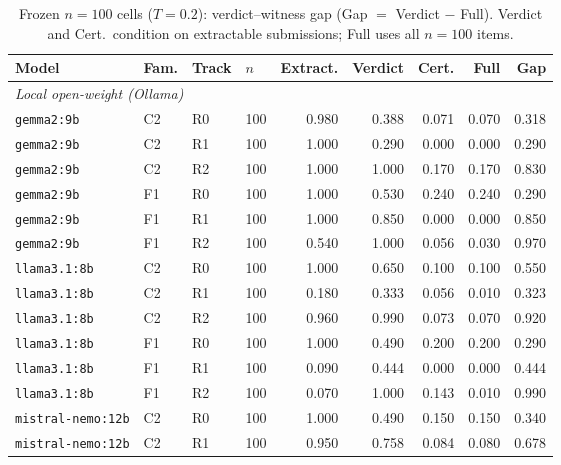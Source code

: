 \begin{table}[tbp]
  \centering
  \caption{Frozen $n{=}100$ cells ($T{=}0.2$): verdict--witness gap (Gap $=$ Verdict $-$ Full). Verdict and Cert.\ condition on extractable submissions; Full uses all $n{=}100$ items.}
  \label{tab:knowing-showing-gap-n100}
  \setlength{\tabcolsep}{2.5pt}
  \begin{tabular}{@{}llllrrrrr@{}}
    \toprule
    Model & Fam. & Track & $n$ & Extract. & Verdict & Cert. & Full & Gap \\
    \midrule
    \multicolumn{9}{l}{\textit{Local open-weight (Ollama)}} \\
    \texttt{gemma2:9b} & C2 & R0 & 100 & 0.980 & 0.388 & 0.071 & 0.070 & 0.318 \\
    \texttt{gemma2:9b} & C2 & R1 & 100 & 1.000 & 0.290 & 0.000 & 0.000 & 0.290 \\
    \texttt{gemma2:9b} & C2 & R2 & 100 & 1.000 & 1.000 & 0.170 & 0.170 & 0.830 \\
    \texttt{gemma2:9b} & F1 & R0 & 100 & 1.000 & 0.530 & 0.240 & 0.240 & 0.290 \\
    \texttt{gemma2:9b} & F1 & R1 & 100 & 1.000 & 0.850 & 0.000 & 0.000 & 0.850 \\
    \texttt{gemma2:9b} & F1 & R2 & 100 & 0.540 & 1.000 & 0.056 & 0.030 & 0.970 \\
    \texttt{llama3.1:8b} & C2 & R0 & 100 & 1.000 & 0.650 & 0.100 & 0.100 & 0.550 \\
    \texttt{llama3.1:8b} & C2 & R1 & 100 & 0.180 & 0.333 & 0.056 & 0.010 & 0.323 \\
    \texttt{llama3.1:8b} & C2 & R2 & 100 & 0.960 & 0.990 & 0.073 & 0.070 & 0.920 \\
    \texttt{llama3.1:8b} & F1 & R0 & 100 & 1.000 & 0.490 & 0.200 & 0.200 & 0.290 \\
    \texttt{llama3.1:8b} & F1 & R1 & 100 & 0.090 & 0.444 & 0.000 & 0.000 & 0.444 \\
    \texttt{llama3.1:8b} & F1 & R2 & 100 & 0.070 & 1.000 & 0.143 & 0.010 & 0.990 \\
    \texttt{mistral-nemo:12b} & C2 & R0 & 100 & 1.000 & 0.490 & 0.150 & 0.150 & 0.340 \\
    \texttt{mistral-nemo:12b} & C2 & R1 & 100 & 0.950 & 0.758 & 0.084 & 0.080 & 0.678 \\

\end{tabular}
\end{table}
